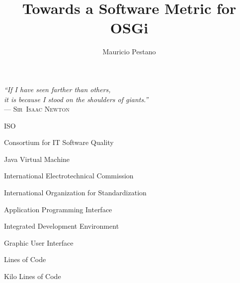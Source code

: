 \documentclass[cic,tc,english]{iiufrgs} %
\title{Towards a Software Metric for OSGi}
\author{Mauricio Pestano}{Rafael}
\begin{document}
\maketitle
\clearpage
\begin{flushright}
\mbox{}\vfill
{\sffamily\itshape
``If I have seen farther than others,\\
it is because I stood on the shoulders of giants.''\\}
--- \textsc{Sir~Isaac Newton}
\end{flushright}





\tableofcontents





\listoffigures

\listoftables

\begin{listofabbrv}{ISO}
        \item[CISQ] Consortium for IT Software Quality 
        \item[JVM] Java Virtual Machine
        \item[IEC] International Electrotechnical Commission
        \item[ISO] International Organization for Standardization
        \item[API] Application Programming Interface 
        \item[IDE] Integrated Development Environment 
        \item[GUI] Graphic User Interface
        \item[LOC] Lines of Code
        \item[KLOC] Kilo Lines of Code

\end{listofabbrv}


\end{document}
